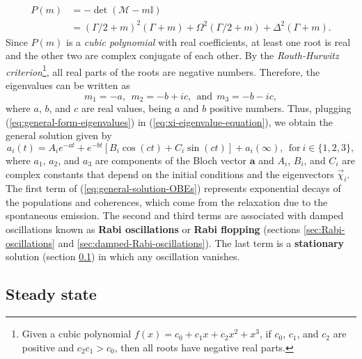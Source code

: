 \begin{align}
	P(m) &= -\det(\mathcal{M} - m\mathbb{I}) \\
	&= (\Gamma/2 + m)^2 (\Gamma + m) + \Omega^2(\Gamma/2 + m) + \Delta^2 (\Gamma + m).
	\label{eq:characteristic-polynomial}
\end{align}
Since $ P(m) $ is a \textit{cubic polynomial} with real coefficients, at least one root is real and the other two are complex conjugate of each other. By the \textit{Routh-Hurwitz criterion}\footnote{Given a cubic polynomial $f(x) = c_0 + c_1 x + c_2 x^2 + x^3 $, if $ c_0 $, $ c_1 $, and $ c_2 $ are positive and $ c_2c_1 > c_0 $, then all roots have negative real parts.}, all real parts of the roots are negative numbers. Therefore, the eigenvalues can be written as
\begin{equation}
	m_1 = -a,\ \ m_2 = -b + ic,\ \ \textrm{and}\ \ m_3 = -b - ic,
	\label{eq:general-form-eigenvalues}
\end{equation} 
where $ a $, $ b $, and $ c $ are real values, being $ a $ and $ b $ positive numbers. Thus, plugging (\ref{eq:general-form-eigenvalues}) in (\ref{eq:xi-eigenvalue-equation}), we obtain the general solution given by
\begin{equation}
	a_{i}(t) = A_i e^{-at} + e^{-b t}[B_i \cos(ct) + C_i \sin(ct)] + a_i(\infty),\ \ \textrm{for}\ i \in \{1,2,3\},
	\label{eq:general-solution-OBEs}
\end{equation}
where $ a_1 $, $ a_2 $, and $ a_3 $ are components of the Bloch vector $ \mathbf{a} $ and $ A_i $, $ B_i $, and $ C_i $ are complex constants that depend on the initial conditions and the eigenvectors $ \vec{\chi}_i $. The first term of (\ref{eq:general-solution-OBEs}) represents exponential decays of the populations and coherences, which come from the relaxation due to the spontaneous emission. The second and third terms are associated with damped oscillations known as \textbf{Rabi oscillations} or \textbf{Rabi flopping} (sections \ref{sec:Rabi-oscillations} and \ref{sec:damped-Rabi-oscillations}). The last term is a \textbf{stationary} solution (section \ref{sec:steady-state}) in which any oscillation vanishes.

\subsection{Steady state}
\label{sec:steady-state}

